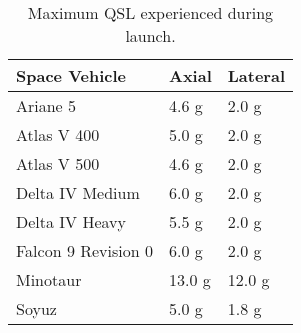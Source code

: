 
\begin{table}[!htb]
\centering
\begin{tabular}{|l|l|l|}
\hline
\rowcolor[HTML]{C0C0C0} 
Space Vehicle       & Axial                   & Lateral                \\ \hline
Ariane 5            & 4.6 g \cite{Ariane}     & 2.0 g \cite{Ariane}    \\ \hline
\rowcolor[HTML]{EFEFEF} 
Atlas V 400         & 5.0 g \cite{AtlasV}     & 2.0 g \cite{AtlasV}    \\ \hline
Atlas V 500         & 4.6 g \cite{AtlasV}     & 2.0 g \cite{AtlasV}    \\ \hline
\rowcolor[HTML]{EFEFEF} 
Delta IV Medium     & 6.0 g \cite{DeltaIV}    & 2.0 g \cite{DeltaIV}   \\ \hline
Delta IV Heavy      & 5.5 g \cite{DeltaIV}    & 2.0 g \cite{DeltaIV}   \\ \hline
\rowcolor[HTML]{EFEFEF} 
Falcon 9 Revision 0 & 6.0 g \cite{Falcon9}    & 2.0 g \cite{Falcon9}   \\ \hline
Minotaur            & 13.0 g  \cite{Minotaur} & 12.0 g \cite{Minotaur} \\ \hline
\rowcolor[HTML]{EFEFEF} 
Soyuz               & 5.0 g \cite{Soyuz}      & 1.8 g \cite{Soyuz}     \\ \hline
\end{tabular}
\caption{Maximum \ac{QSL} experienced during launch.}
\label{QSLTable}
\end{table}
